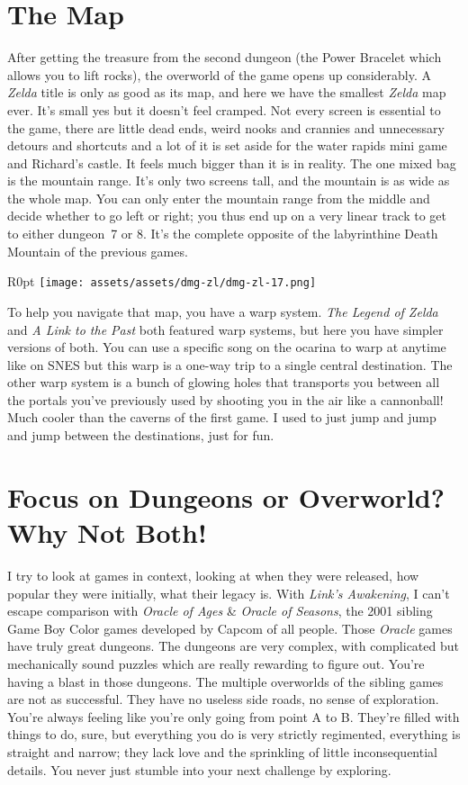\documentclass{book}
\begin{document}
\FloatBarrier\needspace{5pt}\section*{The Map}\nopagebreak[4]

After getting the treasure from the second dungeon (the Power Bracelet which allows you to lift rocks), the overworld of the game opens up considerably. A \emph{Zelda} title is only as good as its map, and here we have the smallest \emph{Zelda} map ever. It’s small yes but it doesn’t feel cramped. Not every screen is essential to the game, there are little dead ends, weird nooks and crannies and unnecessary detours and shortcuts and a lot of it is set aside for the water rapids mini game and Richard’s castle. It feels much bigger than it is in reality. The one mixed bag is the mountain range. It’s only two screens tall, and the mountain is as wide as the whole map. You can only enter the mountain range from the middle and decide whether to go left or right; you thus end up on a very linear track to get to either dungeon 7 or 8. It’s the complete opposite of the labyrinthine Death Mountain of the previous games.

\begin{wrapfigure}{R}{0pt} \texttt{[image: assets/assets/dmg-zl/dmg-zl-17.png]}\end{wrapfigure}
To help you navigate that map, you have a warp system. \emph{The Legend of Zelda} and \emph{A Link to the Past} both featured warp systems, but here you have simpler versions of both. You can use a specific song on the ocarina to warp at anytime like on SNES but this warp is a one-way trip to a single central destination. The other warp system is a bunch of glowing holes that transports you between all the portals you’ve previously used by shooting you in the air like a cannonball! Much cooler than the caverns of the first game. I used to just jump and jump and jump between the destinations, just for fun.

\FloatBarrier\needspace{5pt}\section*{Focus on Dungeons or Overworld? Why Not Both!}\nopagebreak[4]

I try to look at games in context, looking at when they were released, how popular they were initially, what their legacy is. With \emph{Link’s Awakening}, I can’t escape comparison with \emph{Oracle of Ages} \& \emph{Oracle of Seasons}, the 2001 sibling Game Boy Color games developed by Capcom of all people. Those \emph{Oracle} games have truly great dungeons. The dungeons are very complex, with complicated but mechanically sound puzzles which are really rewarding to figure out. You’re having a blast in those dungeons. The multiple overworlds of the sibling games are not as successful. They have no useless side roads, no sense of exploration. You’re always feeling like you’re only going from point A to B. They’re filled with things to do, sure, but everything you do is very strictly regimented, everything is straight and narrow; they lack love and the sprinkling of little inconsequential details. You never just stumble into your next challenge by exploring.
\end{document}

